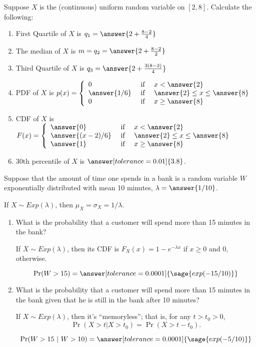 \documentclass{ximera}
\begin{document}
\begin{problem}
    Suppose $X$ is the (continuous) uniform random variable on $[2,8]$. Calculate the following:
    
    \begin{enumerate}
        \item First Quartile of $X$ is $q_1=\answer{2+\frac{8-2}{4}}$
        \item The median of $X$ is $m=q_2=\answer{2+\frac{8-2}{2}}$
        \item Third Quartile of $X$ is $q_3=\answer{2+\frac{3(8-2)}{4}}$
        \item PDF of $X$ is $p(x)=\left\{\begin{array}{lcl} 0 & \mbox{ if } & x < \answer{2}
        \\
        \answer{1/6} & \mbox{ if } & \answer{2} \leq x \leq \answer{8}
        \\
        0 & \mbox{ if } & x \geq \answer{8}
        \end{array} \right.$
        \item CDF of $X$ is $F(x)=\left\{\begin{array}{lcl} \answer{0} & \mbox{ if } & x < \answer{2}
        \\
        \answer{(x-2)/6} & \mbox{ if } & \answer{2} \leq x \leq \answer{8}
        \\
        \answer{1} & \mbox{ if } & x \geq \answer{8}
        \end{array} \right.$
        \item 30th percentile of $X$ is $\answer[tolerance=0.01]{3.8}$.
    \end{enumerate}
\end{problem}
\begin{problem}
Suppose that the amount of time one
spends in a bank is a random variable $W$ exponentially distributed with
mean 10 minutes, $\lambda = \answer{1/10}$.
\begin{hint}
   If $X\sim Exp(\lambda)$, then $\mu_X=\sigma_X=1/\lambda$. 
\end{hint}
\begin{enumerate}
\item What is the probability
that a customer will spend more than 15
minutes in the bank? 
\begin{hint}
   If $X\sim Exp(\lambda)$, then its CDF is $F_X(x)=1-e^{-\lambda x}$ if $x\geq 0$ and 0, otherwise. 
\end{hint}

$$\Pr(W> 15)=\answer[tolerance=0.0001]{\sage{exp(-15/10)}}$$

\item What is the probability
that a customer will spend more than 15 minutes
in the bank given that he is still in the bank
after 10 minutes?
\begin{hint}
   If $X\sim Exp(\lambda)$, then it's ``memoryless''; that is, for any $t>t_0>0$,
   $$\Pr(X>t|X>t_0)=\Pr(X>t-t_0).$$
\end{hint}

$$\Pr(W> 15 ~|~ W> 10)=\answer[tolerance=0.0001]{\sage{exp(-5/10)}}$$

\end{enumerate}

\end{problem}
\end{document}
